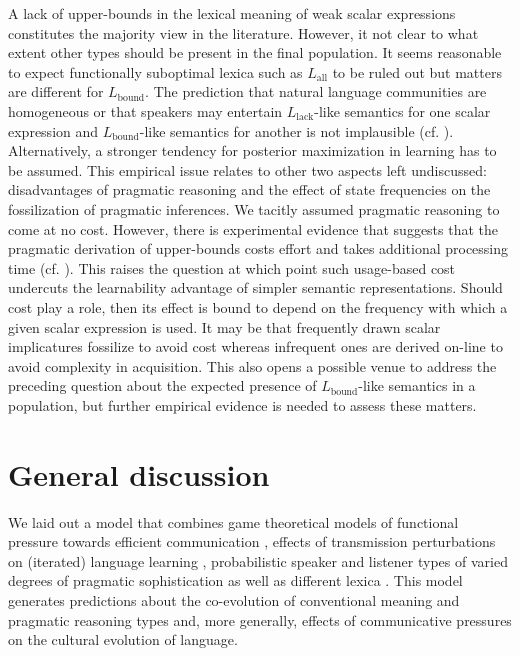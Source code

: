 \documentclass[a4paper]{article}
\newcommand{\mylang}[1]{\ensuremath{L_{\text{#1}}}\xspace} %
\newcommand{\Lall}{\mylang{all}}
\newcommand{\Lbound}{\mylang{bound}}
\newcommand{\Llack}{\mylang{lack}}
\begin{document}
A lack of upper-bounds in the lexical meaning of weak scalar expressions constitutes the majority view in the literature. However, it not clear to what extent other types should be present in the final population. It seems reasonable to expect functionally suboptimal lexica such as $\Lall$ to be ruled out but matters are different for $\Lbound$. The prediction that natural language communities are homogeneous or that speakers may entertain $\Llack$-like semantics for one scalar expression and $\Lbound$-like semantics for another is not implausible (cf. \citealt{franke+degen:2016}). Alternatively, a stronger tendency for posterior maximization in learning has to be assumed. This empirical issue relates to other two aspects left undiscussed: disadvantages of pragmatic reasoning and the effect of state frequencies on the fossilization of pragmatic inferences. We tacitly assumed pragmatic reasoning to come at no cost. However, there is experimental evidence that suggests  that the pragmatic derivation of upper-bounds costs effort and takes additional processing time (cf. \citealt{deNeys+schaeken:2007, huang+snedeker:2009}). This raises the question at which point such usage-based cost undercuts the learnability advantage of simpler semantic representations. Should cost play a role, then its effect is bound to depend on the frequency with which a given scalar expression is used. It may be that frequently drawn scalar implicatures fossilize to avoid cost whereas infrequent ones are derived on-line to avoid complexity in acquisition. This also opens a possible venue to address the preceding question about the expected presence of $\Lbound$-like semantics in a population, but further empirical evidence is needed to assess these matters.


\section{General discussion}\label{sec:discussion}
We laid out a model that combines game theoretical models of functional pressure towards efficient communication \citep{nowak+krakauer:1999}, effects of transmission perturbations on (iterated) language learning \citep{griffiths+kalish:2007}, probabilistic speaker and listener types of varied degrees of pragmatic sophistication \citep{frank+goodman:2012, franke+jaeger:2014} as well as different lexica \citep{bergen+etal:2012,bergen+etal:2016}. This model generates predictions about the co-evolution of conventional meaning and pragmatic reasoning types and, more generally, effects of communicative pressures on the cultural evolution of language. 
\end{document}
